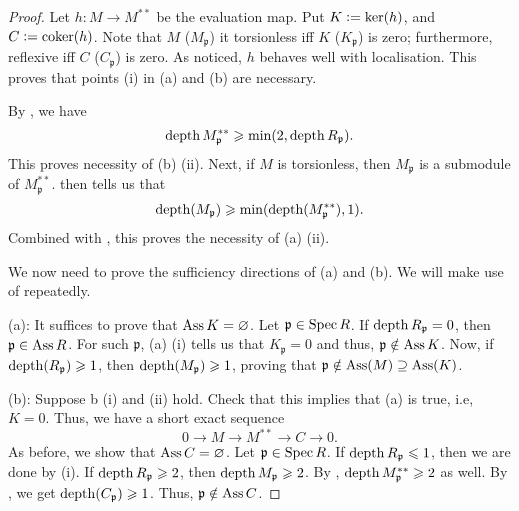 \documentclass[12pt]{article}
\begin{document}
\begin{proof} 
	Let $h : M \to M^{\ast \ast}$ be the evaluation map. Put $K \vcentcolon= \ker(h)$, and $C \vcentcolon= \operatorname{coker}(h)$. Note that $M$ ($M_{\mathfrak{p}}$) it torsionless iff $K$ ($K_{\mathfrak{p}}$) is zero; furthermore, reflexive iff $C$ ($C_{\mathfrak{p}}$) is zero. As noticed, $h$ behaves well with localisation. This proves that points (i) in (a) and (b) are necessary. 

	By , we have
	\begin{equation} \label{eq:010}
		\operatorname{depth} M_{\mathfrak{p}}^{\ast \ast} \geqslant \min(2, \operatorname{depth} R_{\mathfrak{p}}).
	\end{equation}
	This proves necessity of (b) (ii). Next, if $M$ is torsionless, then $M_{\mathfrak{p}}$ is a submodule of $M_{\mathfrak{p}}^{\ast \ast}$.  then tells us that
	\begin{equation*} 
		\operatorname{depth}(M_{\mathfrak{p}}) \geqslant \min(\operatorname{depth}(M_{\mathfrak{p}}^{\ast \ast}), 1).
	\end{equation*}
	Combined with , this proves the necessity of (a) (ii).

	We now need to prove the sufficiency directions of (a) and (b). We will make use of  repeatedly.

	(a): It suffices to prove that $\operatorname{Ass} K = \varnothing$. Let $\mathfrak{p} \in \operatorname{Spec} R$. If $\operatorname{depth} R_{\mathfrak{p}} = 0$, then $\mathfrak{p} \in \operatorname{Ass} R$. For such $\mathfrak{p}$, (a) (i) tells us that $K_{\mathfrak{p}} = 0$ and thus, $\mathfrak{p} \notin \operatorname{Ass} K$. \newline
	Now, if $\operatorname{depth}(R_{\mathfrak{p}}) \geqslant 1$, then $\operatorname{depth}(M_{\mathfrak{p}}) \geqslant 1$, proving that $\mathfrak{p} \notin \operatorname{Ass}(M) \supseteq \operatorname{Ass}(K)$.

	(b): Suppose b (i) and (ii) hold. Check that this implies that (a) is true, i.e, $K = 0$. Thus, we have a short exact sequence
	\begin{equation*} 
		0 \to M \to M^{\ast \ast} \to C \to 0.
	\end{equation*} 
	As before, we show that $\operatorname{Ass} C = \varnothing$. \newline
	Let $\mathfrak{p} \in \operatorname{Spec} R$. If $\operatorname{depth} R_{\mathfrak{p}} \leqslant 1$, then we are done by (i). If $\operatorname{depth} R_{\mathfrak{p}} \geqslant 2$, then $\operatorname{depth} M_{\mathfrak{p}} \geqslant 2$. By , $\operatorname{depth} M_{\mathfrak{p}}^{\ast \ast} \geqslant 2$ as well. By , we get $\operatorname{depth}(C_{\mathfrak{p}}) \geqslant 1$. Thus, $\mathfrak{p} \notin \operatorname{Ass} C$.
\end{proof}
\end{document}
